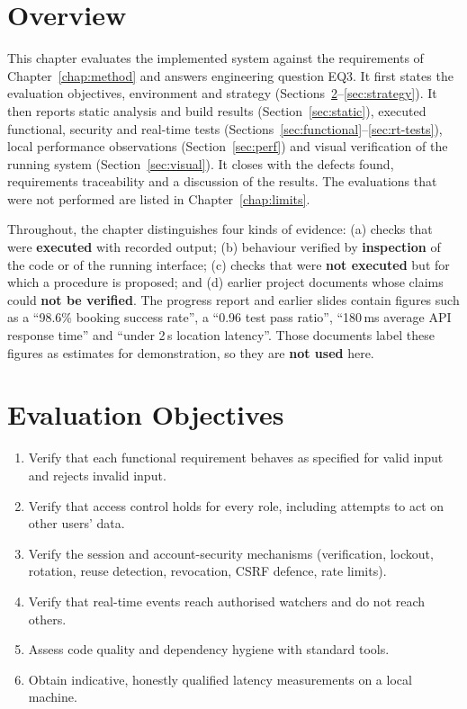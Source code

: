 \section{Overview}

This chapter evaluates the implemented system against the requirements of Chapter~\ref{chap:method} and answers engineering question EQ3. It first states the evaluation objectives, environment and strategy (Sections~\ref{sec:evalobj}--\ref{sec:strategy}). It then reports static analysis and build results (Section~\ref{sec:static}), executed functional, security and real-time tests (Sections~\ref{sec:functional}--\ref{sec:rt-tests}), local performance observations (Section~\ref{sec:perf}) and visual verification of the running system (Section~\ref{sec:visual}). It closes with the defects found, requirements traceability and a discussion of the results. The evaluations that were not performed are listed in Chapter~\ref{chap:limits}.

Throughout, the chapter distinguishes four kinds of evidence: (a) checks that were \textbf{executed} with recorded output; (b) behaviour verified by \textbf{inspection} of the code or of the running interface; (c) checks that were \textbf{not executed} but for which a procedure is proposed; and (d) earlier project documents whose claims could \textbf{not be verified}. The progress report and earlier slides contain figures such as a ``98.6\% booking success rate'', a ``0.96 test pass ratio'', ``180\,ms average API response time'' and ``under 2\,s location latency''. Those documents label these figures as estimates for demonstration, so they are \textbf{not used} here.

\section{Evaluation Objectives}
\label{sec:evalobj}

\begin{enumerate}[label=E\arabic*.]
  \item Verify that each functional requirement behaves as specified for valid input and rejects invalid input.
  \item Verify that access control holds for every role, including attempts to act on other users' data.
  \item Verify the session and account-security mechanisms (verification, lockout, rotation, reuse detection, revocation, CSRF defence, rate limits).
  \item Verify that real-time events reach authorised watchers and do not reach others.
  \item Assess code quality and dependency hygiene with standard tools.
  \item Obtain indicative, honestly qualified latency measurements on a local machine.
\end{enumerate}

